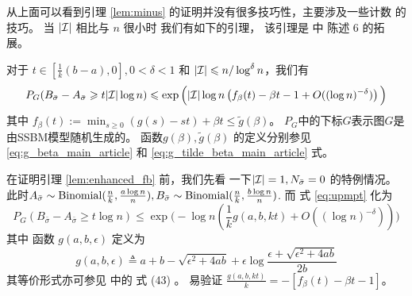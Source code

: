 从上面可以看到引理 \ref{lem:minus} 的证明并没有很多技巧性，主要涉及一些计数
的技巧。
当 $|\mathcal{I}|$ 相比与 $n$ 很小时
我们有如下的引理， 该引理是 \citet{ye2020exact} 中 陈述 6 的拓展。 

\begin{lemma}
  \label{lem:enhanced_fb}
	对于 $t\in [\frac{1}{k}(b-a), 0], 0<\delta <1$
	和 $ |\mathcal{I}| \leqslant n/\log^{\delta} n$，我们有
\begin{equation} \label{eq:upmpt}
	P_G(B_{\bar{\sigma}}-A_{\bar{\sigma}}\geqslant t |\mathcal{I}| \log n) 
	\leqslant  \exp\Big(|\mathcal{I}|\log n
	\left(
    f_{\beta}(t) - \beta t -1	+ O((\log n)^{-\delta}) \right)\Big)
	\end{equation}
	其中 $f_{\beta}(t) := \min_{s\geq 0} (g(s) - st) + \beta t \leq \tilde{g}(\beta) $。
  $P_G$中的下标$G$表示图$G$是由SSBM模型随机生成的。
  函数$g(\beta), \tilde{g}(\beta)$
  的定义分别参见
  \eqref{eq:g_beta_main_article}
  和
  \eqref{eq:g_tilde_beta_main_article} 式。
\end{lemma}
在证明引理 \ref{lem:enhanced_fb} 前，我们先看
一下$|\mathcal{I}|=1, N_{\bar{\sigma}}=0$ 的特例情况。
此时$A_{\bar{\sigma}} \sim \operatorname{Binomial}(\frac{n}{k}, \frac{a \log n}{n}),
B_{\bar{\sigma}} \sim \operatorname{Binomial}(\frac{n}{k}, \frac{b \log n}{n})$.
而 式 \eqref{eq:upmpt} 化为
\begin{equation}
  P_G(B_{\bar{\sigma}}-A_{\bar{\sigma}}\ge t  \log n) 
	\le  \exp\Big(-\log n
	\left(
   \frac{1}{k} g(a,b,kt) + O((\log n)^{-\delta}) \right)\Big)
\end{equation}
其中 函数 $g(a,b,\epsilon)$ 定义为
\begin{equation}  \label{equation:g}
  g(a,b,\epsilon) \triangleq a + b - \sqrt{\epsilon^2 + 4ab} + \epsilon \log \frac{\epsilon + \sqrt{\epsilon^2 + 4ab}}{2b}
\end{equation}
其等价形式亦可参见 \citet{abbe2015exact} 中的 式 (43)
。
易验证 $\frac{g(a,b,kt)}{k}=-[f_{\beta}(t)-\beta t -1]$。
